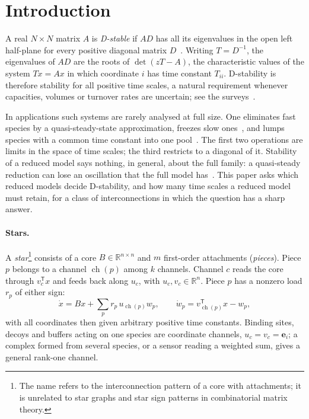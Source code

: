 \documentclass[11pt,a4paper]{article}
\theoremstyle{plain}
\theoremstyle{definition}
\theoremstyle{remark}
\newcommand{\R}{\mathbb{R}}
\newcommand{\ch}{\operatorname{ch}}
\newcommand{\be}{\mathbf{e}}
\newcommand{\T}{\mathsf{T}}
\begin{document}
\section{Introduction}\label{sec:intro}

A real $N\times N$ matrix $A$ is \emph{D-stable} if $AD$ has all its eigenvalues in the
open left half-plane for every positive diagonal matrix $D$~\cite{enthoven1956,arrow1958}.
Writing $T=D^{-1}$, the eigenvalues of $AD$ are the roots of $\det(zT-A)$, the
characteristic values of the system $T\dot x=Ax$ in which coordinate $i$ has time constant
$T_{ii}$. D-stability is therefore stability for all positive time scales, a natural
requirement whenever capacities, volumes or turnover rates are uncertain; see the
surveys~\cite{hershkowitz1992,kushel2019}.

In applications such systems are rarely analysed at full size. One eliminates fast species
by a quasi-steady-state approximation, freezes slow ones~\cite{segel1989,kokotovic1999},
and lumps species with a common time constant into one pool~\cite{wei1969}. The first two
operations are limits in the space of time scales; the third restricts to a diagonal of it.
Stability of a reduced model says nothing, in general, about the full family: a quasi-steady
reduction can lose an oscillation that the full model has~\cite{flach2006,kimtyson2020}.
This paper asks which reduced models decide D-stability, and how many time scales a reduced
model must retain, for a class of interconnections in which the question has a sharp answer.

\paragraph{Stars.} A \emph{star}\footnote{The name refers to the interconnection pattern of
a core with attachments; it is unrelated to star graphs and star sign patterns in
combinatorial matrix theory.} consists of a core $B\in\R^{n\times n}$ and $m$ first-order
attachments (\emph{pieces}). Piece $p$ belongs to a channel $\ch(p)$ among $k$ channels.
Channel $c$ reads the core through $v_c^\T x$ and feeds back along $u_c$, with
$u_c,v_c\in\R^n$. Piece $p$ has a nonzero load $r_p$ of either sign:
\[
  \dot x = Bx+\sum_p r_p\,u_{\ch(p)}w_p,\qquad \dot w_p = v_{\ch(p)}^\T x-w_p ,
\]
with all coordinates then given arbitrary positive time constants. Binding sites, decoys
and buffers acting on one species are coordinate channels, $u_c=v_c=\be_i$; a complex
formed from several species, or a sensor reading a weighted sum, gives a general rank-one
channel.
\end{document}
